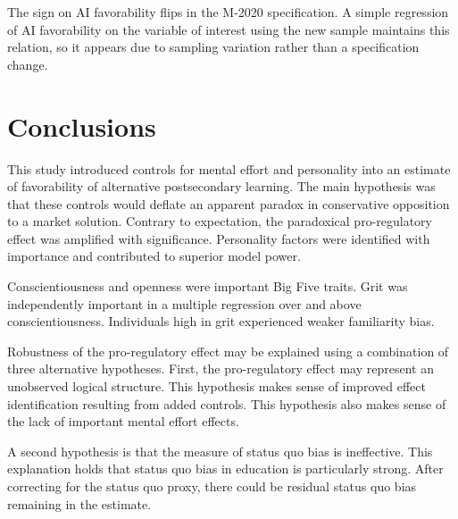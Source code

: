 \documentclass[review]{elsarticle}
\begin{document}

The sign on AI favorability flips in the M-2020 specification.
A simple regression of AI favorability on the variable of interest using the new sample maintains this relation,
so it appears due to sampling variation rather than a specification change.

\section{Conclusions}

This study introduced controls for mental effort and personality into an estimate of favorability of alternative postsecondary learning.
The main hypothesis was that these controls would deflate an apparent paradox in conservative opposition to a market solution.
Contrary to expectation, the paradoxical pro-regulatory effect was amplified with significance.
Personality factors were identified with importance and contributed to superior model power.

Conscientiousness and openness were important Big Five traits.
Grit was independently important in a multiple regression over and above conscientiousness.
Individuals high in grit experienced weaker familiarity bias.


Robustness of the pro-regulatory effect may be explained using a combination of three alternative hypotheses.
First, the pro-regulatory effect may represent an unobserved logical structure.
This hypothesis makes sense of improved effect identification resulting from added controls.
This hypothesis also makes sense of the lack of important mental effort effects.

A second hypothesis is that the measure of status quo bias is ineffective.
This explanation holds that status quo bias in education is particularly strong.
After correcting for the status quo proxy, there could be residual status quo bias remaining in the estimate.
\end{document}
